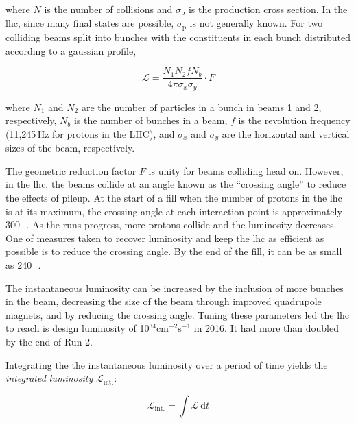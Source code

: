 where $N$ is the number of collisions and $\sigma_{\mathrm{p}}$ is the production cross section. In the \acrshort{lhc}, since many final states are possible, $\sigma_{\mathrm{p}}$ is not generally known. For two colliding beams split into bunches with the constituents in each bunch distributed according to a gaussian profile,

\begin{equation}
    \mathcal{L} = \frac{N_1 N_2 f N_b}{4 \pi \sigma_x \sigma_y} \cdot F %
    \label{eq:lumi_inst_head_on_colliding_beams}
\end{equation}

where $N_1$ and $N_2$ are the number of particles in a bunch in beams 1 and 2, respectively, $N_b$ is the number of bunches in a beam, $f$ is the revolution frequency (11,245\,Hz for protons in the LHC), and $\sigma_x$ and $\sigma_y$ are the horizontal and vertical sizes of the beam, respectively.

The geometric reduction factor $F$ is unity for beams colliding head on. However, in the \acrshort{lhc}, the beams collide at an angle known as the ``crossing angle'' to reduce the effects of pileup. At the start of a fill when the number of protons in the \acrshort{lhc} is at its maximum, the crossing angle at each interaction point is approximately 300\,\si{\micro{}}. As the runs progress, more protons collide and the luminosity decreases. One of measures taken to recover luminosity and keep the \acrshort{lhc} as efficient as possible is to reduce the crossing angle. By the end of the fill, it can be as small as 240\,\si{\micro{}}.


The instantaneous luminosity can be increased by the inclusion of more bunches in the beam, decreasing the size of the beam through improved quadrupole magnets, and by reducing the crossing angle. Tuning these parameters led the \acrshort{lhc} to reach is design luminosity of 10$^{34}\text{cm}^{-2}\text{s}^{-1}$ in 2016. It had more than doubled by the end of Run-2.

Integrating the the instantaneous luminosity over a period of time yields the \emph{integrated luminosity} $\mathcal{L}_{\mathrm{int.}}$:

\begin{equation}
    \mathcal{L}_{\mathrm{int.}} = \int \mathcal{L} \ \mathrm{d}t
    \label{eq:lumi_integrated}
\end{equation}


